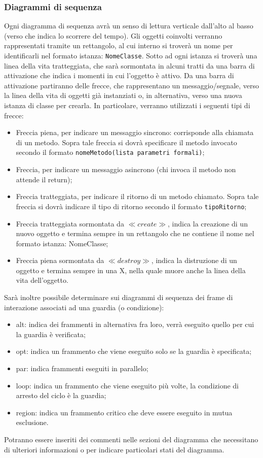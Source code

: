 \documentclass[NormeDiProgetto.tex]{subfiles}
\begin{document}
\subsubsection{Diagrammi di sequenza}
Ogni diagramma di sequenza avrà un senso di lettura verticale dall'alto al basso (verso che indica lo scorrere del tempo). Gli oggetti coinvolti verranno rappresentati tramite un rettangolo, al cui interno si troverà un nome per identificarli nel formato istanza: \texttt{NomeClasse}. Sotto ad ogni istanza si troverà una linea della vita tratteggiata, che sarà sormontata in alcuni tratti da una barra di attivazione che indica i momenti in cui l'oggetto è attivo. Da una barra di attivazione partiranno delle frecce, che rappresentano un messaggio/segnale, verso la linea della vita di oggetti già instanziati o, in alternativa, verso una nuova istanza di classe per crearla. In particolare, verranno utilizzati i seguenti tipi di frecce:
\begin{itemize}
\item  Freccia piena, per indicare un messaggio sincrono: corrisponde alla chiamata di un metodo. Sopra tale freccia si dovrà specificare il metodo invocato secondo il formato \texttt{nomeMetodo(lista parametri formali)};
\item  Freccia, per indicare un messaggio asincrono (chi invoca il metodo non attende il return);
\item  Freccia tratteggiata, per indicare il ritorno di un metodo chiamato. Sopra tale
freccia si dovrà indicare il tipo di ritorno secondo il formato \texttt{tipoRitorno};
\item  Freccia tratteggiata sormontata da $\ll create \gg$, indica la creazione di un nuovo
oggetto e termina sempre in un rettangolo che ne contiene il nome nel formato
istanza: NomeClasse;
\item  Freccia piena sormontata da $\ll destroy \gg$, indica la distruzione di un oggetto e
termina sempre in una X, nella quale muore anche la linea della vita dell'oggetto.
\end{itemize}
Sarà inoltre possibile determinare sui diagrammi di sequenza dei frame di interazione associati ad una guardia (o condizione):
\begin{itemize}
\item alt: indica dei frammenti in alternativa fra loro, verrà eseguito quello per cui la guardia è verificata;
\item opt: indica un frammento che viene eseguito solo se la guardia è specificata;
\item par: indica frammenti eseguiti in parallelo;
\item loop: indica un frammento che viene eseguito più volte, la condizione di arresto del ciclo è la guardia;
\item region: indica un frammento critico che deve essere eseguito in mutua esclusione.
\end{itemize}
Potranno essere inseriti dei commenti nelle sezioni del diagramma che necessitano di ulteriori informazioni o per indicare particolari stati del diagramma.
\end{document}
